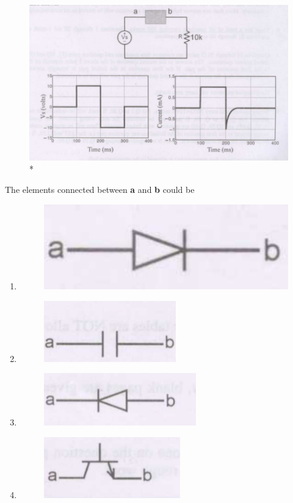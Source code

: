 \documentclass[journal,12pt,onecolumn]{IEEEtran}
\theoremstyle{remark}
\begin{document}
\begin{flushleft}
\begin{enumerate}
\begin{figure}[h!]
    \centering
    \includegraphics[width=0.5\columnwidth]{figs/17544763396671480524229116990460.png}
    \caption{*}
\label{fig:placeholder}
\end{figure}
The elements connected between \textbf{a} and \textbf{b} could be 
\begin{multicols}{2}
\begin{enumerate}
\item \begin{figure}[H]
    \includegraphics[width=0.4\columnwidth]{figs/Screenshot_20250818-181213.png}
   
    \label{fig:placeholder}
\end{figure}
\item \begin{figure}[H]
    \includegraphics[width=0.4\columnwidth]{figs/Screenshot_20250818-181242.png}
     \label{fig:placeholder}
\end{figure}
\item  
\begin{figure}[H] \includegraphics[width=0.4\columnwidth]{figs/Screenshot_20250818-181257 (1).png}
  \label{fig:placeholder}
\end{figure}
\item \begin{figure}[H]
    \includegraphics[width=0.4\columnwidth]{figs/Screenshot_20250818-181311.png}
      \label{fig:placeholder}
\end{figure}
\end{enumerate}
\end{multicols}



\end{enumerate}
\end{flushleft}
\end{document}
